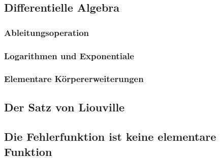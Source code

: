 \subsection{Differentielle Algebra
\label{buch:integrale:section:dalgebra}}

\subsubsection{Ableitungsoperation}

\subsubsection{Logarithmen und Exponentiale}

\subsubsection{Elementare Körpererweiterungen}

\subsection{Der Satz von Liouville
\label{buch:integrale:section:liouville}}

\subsection{Die Fehlerfunktion ist keine elementare Funktion
\label{buch:integrale:section:fehlernichtelementar}}

